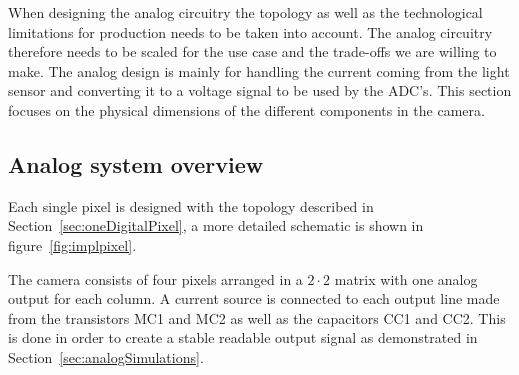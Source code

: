 
When designing the analog circuitry the topology as well as the technological limitations for production needs to be taken into account. The analog circuitry therefore needs to be scaled for the use case and the trade-offs we are willing to make.
The analog design is mainly for handling the current coming from the light sensor and converting it to a voltage signal to be used by the ADC's.
This section focuses on the physical dimensions of the different components in the camera.

\subsection{Analog system overview}

Each single pixel is designed with the topology described in Section~\ref{sec:oneDigitalPixel}, a more detailed schematic is shown in figure~\ref{fig:implpixel}.

The camera consists of four pixels arranged in a $2 \cdot 2 $ matrix with one analog output for each column.
A current source is connected to each output line made from the transistors MC1 and MC2 as well as the capacitors CC1 and CC2.
This is done in order to create a stable readable output signal as demonstrated in Section~\ref{sec:analogSimulations}.

